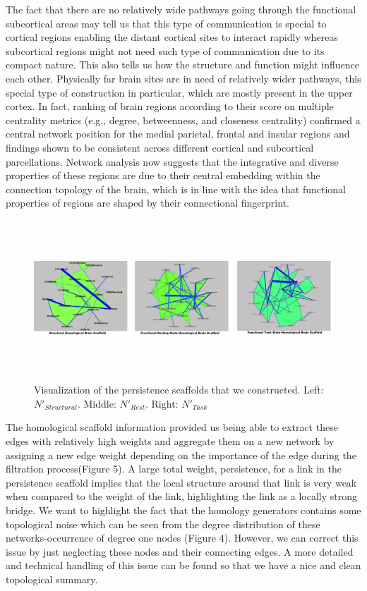 \documentclass[9pt,twocolumn,twoside,lineno]{pnas-new}
\begin{document}
The fact that there are no relatively wide pathways going through the functional subcortical areas may tell us that this type of communication is special to cortical regions enabling the distant cortical sites to interact rapidly whereas subcortical regions might not need such type of communication due to its compact nature. This also tells us how the structure and function might influence each other. Physically far brain sites are in need of relatively wider pathways, this special type of construction in particular, which are mostly present in the upper cortex. In fact, ranking of brain regions according to their score on multiple centrality metrics (e.g., degree, betweenness, and closeness centrality) confirmed a central network position for the medial parietal, frontal and insular regions\cite{structure-funct} and findings shown to be consistent across different cortical and subcortical parcellations. Network analysis now suggests
that the integrative and diverse properties of these regions
are due to their central embedding within the connection
topology of the brain, which is in line with the idea that
functional properties of regions are shaped by their connectional fingerprint.

\begin{figure}%
\centering
\includegraphics[width=18cm,height=6cm]{strucscaf.png}
\caption{Visualization of the persistence scaffolds that we constructed. Left: $N'_{Structural}$. Middle: $N'_{Rest}$. Right: $N'_{Task}$  }
\end{figure}


The homological scaffold information provided us being able to extract these edges with relatively high weights and aggregate them on a new network by assigning a new edge weight depending on the importance of the edge during the filtration process(Figure 5). A large total weight, persistence, for a link in the persistence scaffold implies that the local structure around that link is very weak when compared to the weight of the link, highlighting the link as a locally strong bridge. 
We want to highlight the fact that the homology generators contains some topological noise which can be seen from the degree distribution of these networks-occurrence of degree one nodes (Figure 4). However, we can correct this issue by just neglecting these nodes and their connecting edges. A more detailed and technical handling of this issue can be found \cite{optimalc1,optimalc2} so that we have a nice and clean topological summary. 
\end{document}
